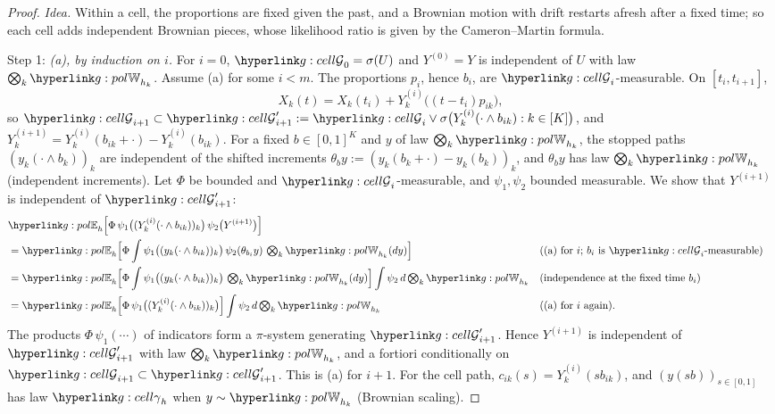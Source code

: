 \documentclass[11pt]{article}
\newcommand{\1}{\mathbf{1}}
\begin{document}
\begin{proof}
\textit{Idea.} Within a cell, the proportions are fixed given the past, and a Brownian motion with drift restarts afresh after a fixed time; so each cell adds
independent Brownian pieces, whose likelihood ratio is given by the Cameron--Martin formula.

Step 1: \emph{(a), by induction on $i$.} For $i=0$, $\gG_0=\sigma(U)$ and $Y^{(0)}=Y$ is independent of $U$ with law $\bigotimes_k\gWi_{h_k}$. Assume (a) for some $i<m$. The
proportions $p_i$, hence $b_i$, are $\gG_i$-measurable. On $[t_i,t_{i+1}]$,
\[
X_k(t)=X_k(t_i)+Y^{(i)}_k\big((t-t_i)p_{ik}\big),
\]
so $\gG_{i+1}\subset\gG'_{i+1}:=\gG_i\vee\sigma\big(Y^{(i)}_k(\cdot\wedge b_{ik}):k\in[K]\big)$, and $Y^{(i+1)}_k=Y^{(i)}_k(b_{ik}+\cdot)-Y^{(i)}_k(b_{ik})$. For a fixed
$b\in[0,1]^K$ and $y$ of law $\bigotimes_k\gWi_{h_k}$, the stopped paths $(y_k(\cdot\wedge b_k))_k$ are independent of the shifted increments
$\theta_by:=(y_k(b_k+\cdot)-y_k(b_k))_k$, and $\theta_by$ has law $\bigotimes_k\gWi_{h_k}$ (independent increments). Let $\Phi$ be bounded and $\gG_i$-measurable, and
$\psi_1,\psi_2$ bounded measurable. We show that $Y^{(i+1)}$ is independent of $\gG'_{i+1}$:
\begin{align*}
&\gEh_h\Big[\Phi\,\psi_1\big((Y^{(i)}_k(\cdot\wedge b_{ik}))_k\big)\,\psi_2\big(Y^{(i+1)}\big)\Big]\\
&=\gEh_h\Big[\Phi\int\psi_1\big((y_k(\cdot\wedge b_{ik}))_k\big)\,\psi_2(\theta_{b_i}y)\,\textstyle\bigotimes_k\gWi_{h_k}(dy)\Big] &&\text{((a) for }i\text{; }b_i\text{ is }\gG_i\text{-measurable)}\\
&=\gEh_h\Big[\Phi\int\psi_1\big((y_k(\cdot\wedge b_{ik}))_k\big)\,\textstyle\bigotimes_k\gWi_{h_k}(dy)\Big]\displaystyle\int\psi_2\,d\textstyle\bigotimes_k\gWi_{h_k} &&\text{(independence at the fixed time }b_i\text{)}\\
&=\gEh_h\Big[\Phi\,\psi_1\big((Y^{(i)}_k(\cdot\wedge b_{ik}))_k\big)\Big]\displaystyle\int\psi_2\,d\textstyle\bigotimes_k\gWi_{h_k} &&\text{((a) for }i\text{ again).}
\end{align*}
The products $\Phi\,\psi_1(\cdots)$ of indicators form a $\pi$-system generating $\gG'_{i+1}$. Hence $Y^{(i+1)}$ is independent of $\gG'_{i+1}$ with law
$\bigotimes_k\gWi_{h_k}$, and a fortiori conditionally on $\gG_{i+1}\subset\gG'_{i+1}$. This is (a) for $i+1$. For the cell path, $c_{ik}(s)=Y^{(i)}_k(sb_{ik})$, and
$(y(sb))_{s\in[0,1]}$ has law $\ggam_h$ when $y\sim\gWi_{h_k}$ (Brownian scaling).


\end{proof}
\end{document}

